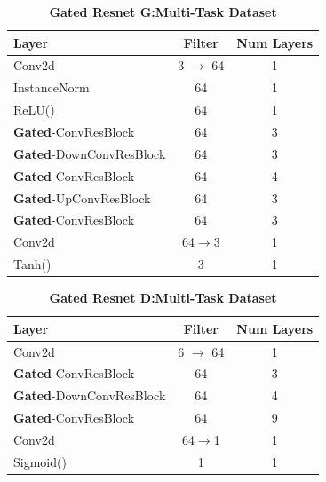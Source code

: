 \documentclass[10pt,twocolumn,letterpaper]{article}
\begin{document}
\begin{table}[ht]
\caption{\textbf{Gated Resnet G:Multi-Task Dataset}}
\centering %
\begin{tabular}{l c c} %
\toprule%
\textbf{Layer} & \textbf{Filter} & \textbf{Num Layers} \\
\midrule
Conv2d & 3 $\rightarrow$ 64 & 1\\
InstanceNorm & 64 & 1 \\ %
ReLU() & 64 & 1\\
\hdashline%
\textbf{Gated}-ConvResBlock & 64 & 3\\
\textbf{Gated}-DownConvResBlock & 64 & 3\\
\textbf{Gated}-ConvResBlock & 64 & 4\\
\textbf{Gated}-UpConvResBlock & 64 & 3\\
\textbf{Gated}-ConvResBlock & 64 & 3\\
\hdashline
Conv2d & 64$\rightarrow$3 & 1 \\
Tanh() & 3 & 1 \\
\bottomrule%
\end{tabular}
\label{table:resnet_g_multitask} %
\end{table}

\begin{table}[ht]
\caption{\textbf{Gated Resnet D:Multi-Task Dataset}}
\centering %
\begin{tabular}{l c c} %
\toprule%
\textbf{Layer} & \textbf{Filter} & \textbf{Num Layers} \\
\midrule
Conv2d & 6 $\rightarrow$ 64 & 1\\
\hdashline%
\textbf{Gated}-ConvResBlock & 64 & 3\\
\textbf{Gated}-DownConvResBlock & 64 & 4\\
\textbf{Gated}-ConvResBlock & 64 & 9\\
\hdashline
Conv2d & 64$\rightarrow$1 & 1 \\
Sigmoid() & 1 & 1 \\
\bottomrule%
\end{tabular}
\label{table:resnet_d_multitask} %
\end{table}
\end{document}

